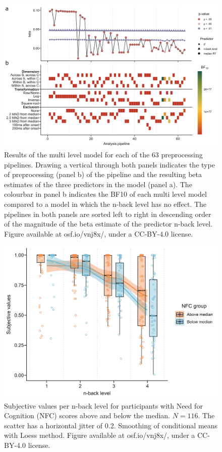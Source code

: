 \documentclass[
  man,floatsintext]{apa6}
\begin{document}
\begin{figure}[H]
\includegraphics[width=\textwidth]{Figures/sca-plot} \caption{Results of the multi level model for each of the 63 preprocessing pipelines. Drawing a vertical through both panels indicates the type of preprocessing (panel b) of the pipeline and the resulting beta estimates of the three predictors in the model (panel a). The colourbar in panel b indicates the BF10 of each multi level model compared to a model in which the n-back level has no effect. The pipelines in both panels are sorted left to right in descending order of the magnitude of the beta estimate of the predictor n-back level. Figure available at osf.io/vnj8x/, under a CC-BY-4.0 license.}\label{fig:sca-plot}
\end{figure}

\begin{figure}[H]
\includegraphics[width=\textwidth]{Figures/nfcgroups-sv} \caption{Subjective values per n-back level for participants with Need for Cognition (NFC) scores above and below the median. $N=116$. The scatter has a horizontal jitter of 0.2. Smoothing of conditional means with Loess method. Figure available at osf.io/vnj8x/, under a CC-BY-4.0 license.}\label{fig:nfcgroups-sv}
\end{figure}
\end{document}
